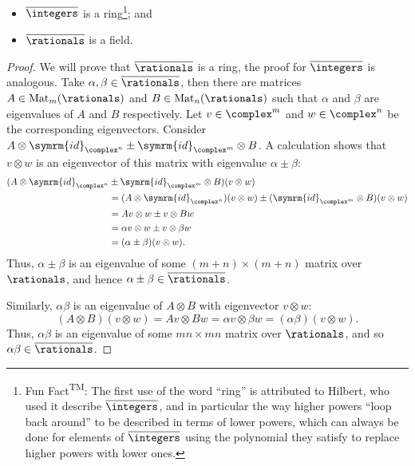 \documentclass[fleqn]{NotesClass}
\newcommand{\id}{\symrm{id}}
\DeclareMathOperator{\Mat}{Mat}
\newcommand{\algNumbers}{\overline{\rationals}}
\newcommand{\algIntegers}{\overline{\integers}}
\begin{document}
    \begin{prp}{}{}
        \begin{itemize}
            \item \(\algIntegers\) is a ring\footnote{Fun Fact\textsuperscript{TM}: The first use of the word \enquote{ring} is attributed to Hilbert, who used it describe \(\algIntegers\), and in particular the way higher powers \enquote{loop back around} to be described in terms of lower powers, which can always be done for elements of \(\algIntegers\) using the polynomial they satisfy to replace higher powers with lower ones.}; and
            \item \(\algNumbers\) is a field.
        \end{itemize}
        \begin{proof}
            \Step{\(\algNumbers\) and \(\algIntegers\) are Rings}
            We will prove that \(\algNumbers\) is a ring, the proof for \(\algIntegers\) is analogous.
            Take \(\alpha, \beta \in \algNumbers\), then there are matrices \(A \in \Mat_m(\rationals)\) and \(B \in \Mat_n(\rationals)\) such that \(\alpha\) and \(\beta\) are eigenvalues of \(A\) and \(B\) respectively.
            Let \(v \in \complex^m\) and \(w \in \complex^n\) be the corresponding eigenvectors.
            Consider \(A \otimes \id_{\complex^n} \pm \id_{\complex^{m}} \otimes B\).
            A calculation shows that \(v \otimes w\) is an eigenvector of this matrix with eigenvalue \(\alpha \pm \beta\):
            \begin{align}
                (A \otimes \id_{\complex^n} &\pm \id_{\complex^{m}} \otimes B)(v \otimes w)\\
                &= (A \otimes \id_{\complex^n})(v \otimes w) \pm (\id_{\complex^m} \otimes B)(v \otimes w)\\
                &= Av \otimes w \pm v \otimes Bw\\
                &= \alpha v \otimes w \pm v \otimes \beta w\\
                &= (\alpha \pm \beta) (v \otimes w).
            \end{align}
            Thus, \(\alpha \pm \beta\) is an eigenvalue of some \((m + n) \times (m + n)\) matrix over \(\rationals\), and hence \(\alpha \pm \beta \in \algNumbers\).
            
            Similarly, \(\alpha\beta\) is an eigenvalue of \(A \otimes B\) with eigenvector \(v \otimes w\):
            \begin{equation}
                (A \otimes B)(v \otimes w) = Av \otimes Bw = \alpha v \otimes \beta w = (\alpha\beta)(v \otimes w).
            \end{equation}
            Thus, \(\alpha\beta\) is an eigenvalue of some \(mn \times mn\) matrix over \(\rationals\), and so \(\alpha\beta \in \algNumbers\).
            

\end{proof}
\end{prp}
\end{document}
